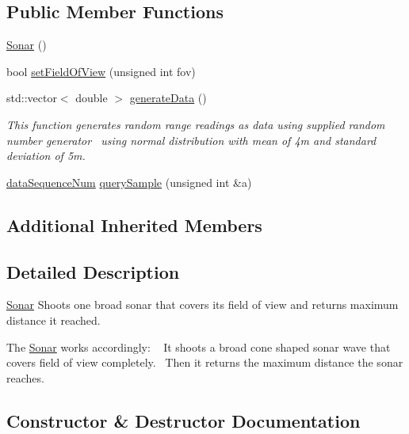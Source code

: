 \subsection*{Public Member Functions}
\begin{DoxyCompactItemize}
\item 
\hyperlink{class_sonar_a71ef009d138f1e372fc35ca0cb6e85e2}{Sonar} ()
\item 
bool \hyperlink{class_sonar_a74d551d0ad61861ccf903f2535d799f0}{set\+Field\+Of\+View} (unsigned int fov)
\item 
std\+::vector$<$ double $>$ \hyperlink{class_sonar_a33cc5f2df6cc1d96a59067be67eab781}{generate\+Data} ()
\begin{DoxyCompactList}\small\item\em This function generates random range readings as data using supplied random number generator~\newline
using normal distribution with mean of 4m and standard deviation of 5m. \end{DoxyCompactList}\item 
\hyperlink{struct_ranger_1_1data_sequence_num}{data\+Sequence\+Num} \hyperlink{class_sonar_a962c7ba3b9a69e6b3b285764dd4eec3c}{query\+Sample} (unsigned int \&a)
\end{DoxyCompactItemize}
\subsection*{Additional Inherited Members}


\subsection{Detailed Description}
\hyperlink{class_sonar}{Sonar} Shoots one broad sonar that covers its field of view and returns maximum distance it reached. 

The \hyperlink{class_sonar}{Sonar} works accordingly\+: ~\newline
It shoots a broad cone shaped sonar wave that covers field of view completely.~\newline
Then it returns the maximum distance the sonar reaches.~\newline
 

\subsection{Constructor \& Destructor Documentation}
